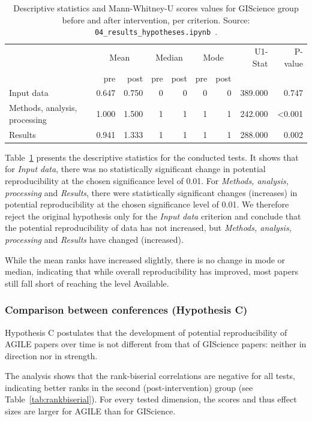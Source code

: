 \documentclass{josis}
\begin{document}
\begin{table}
\begin{tabular}{lrrrrrrrr}
\toprule
 & \multicolumn{2}{c}{Mean} & \multicolumn{2}{c}{Median} & \multicolumn{2}{c}{Mode} & U1-Stat & P-value \\
 & pre & post & pre & post & pre & post &  &  \\
\midrule
Input data & 0.647 & 0.750 & 0 & 0 & 0 & 0 & 389.000 & 0.747 \\
Methods, analysis, processing & 1.000 & 1.500 & 1 & 1 & 1 & 1 & 242.000 & <0.001 \\
Results & 0.941 & 1.333 & 1 & 1 & 1 & 1 & 288.000 & 0.002 \\
\bottomrule
\end{tabular}
\caption{Descriptive statistics and Mann-Whitney-U scores values for GIScience group before and after intervention, per criterion. Source: \texttt{04\_results\_hypotheses.ipynb}~\cite{data}.}
\label{tab:mannwhitney_giscience}
\end{table}

Table~\ref{tab:mannwhitney_giscience} presents the descriptive statistics for the conducted tests. 
It shows that for \textit{Input data}, there was no statistically significant change in potential reproducibility at the chosen significance level of 0.01. For \textit{Methods, analysis, processing} and \textit{Results}, there were statistically significant changes (increases) in potential reproducibility at the chosen significance level of 0.01.
We therefore reject the original hypothesis only for the \textit{Input data} criterion and conclude that the potential reproducibility of data has not increased, but \textit{Methods, analysis, processing} and \textit{Results} have changed (increased).

While the mean ranks have increased slightly, there is no change in mode or median, indicating that while overall reproducibility has improved, most papers still fall short of reaching the level Available. 

\subsubsection{Comparison between conferences (Hypothesis C)}

Hypothesis C postulates that the development of potential reproducibility of AGILE papers over time is not different from that of GIScience papers: neither in direction nor in strength.

The analysis shows that the rank-biserial correlations are negative for all tests, indicating better ranks in the second (post-intervention) group (see Table~\ref{tab:rankbiserial}).
For every tested dimension, the scores and thus effect sizes are larger for AGILE than for GIScience.
\end{document}
